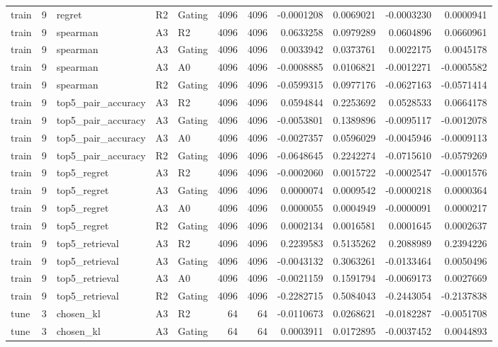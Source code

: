 \begin{tabular}{lrlllrrrrrr}
train & 9 & regret & R2 & Gating & 4096 & 4096 & -0.0001208 & 0.0069021 & -0.0003230 & 0.0000941 \\
train & 9 & spearman & A3 & R2 & 4096 & 4096 & 0.0633258 & 0.0979289 & 0.0604896 & 0.0660961 \\
train & 9 & spearman & A3 & Gating & 4096 & 4096 & 0.0033942 & 0.0373761 & 0.0022175 & 0.0045178 \\
train & 9 & spearman & A3 & A0 & 4096 & 4096 & -0.0008885 & 0.0106821 & -0.0012271 & -0.0005582 \\
train & 9 & spearman & R2 & Gating & 4096 & 4096 & -0.0599315 & 0.0977176 & -0.0627163 & -0.0571414 \\
train & 9 & top5_pair_accuracy & A3 & R2 & 4096 & 4096 & 0.0594844 & 0.2253692 & 0.0528533 & 0.0664178 \\
train & 9 & top5_pair_accuracy & A3 & Gating & 4096 & 4096 & -0.0053801 & 0.1389896 & -0.0095117 & -0.0012078 \\
train & 9 & top5_pair_accuracy & A3 & A0 & 4096 & 4096 & -0.0027357 & 0.0596029 & -0.0045946 & -0.0009113 \\
train & 9 & top5_pair_accuracy & R2 & Gating & 4096 & 4096 & -0.0648645 & 0.2242274 & -0.0715610 & -0.0579269 \\
train & 9 & top5_regret & A3 & R2 & 4096 & 4096 & -0.0002060 & 0.0015722 & -0.0002547 & -0.0001576 \\
train & 9 & top5_regret & A3 & Gating & 4096 & 4096 & 0.0000074 & 0.0009542 & -0.0000218 & 0.0000364 \\
train & 9 & top5_regret & A3 & A0 & 4096 & 4096 & 0.0000055 & 0.0004949 & -0.0000091 & 0.0000217 \\
train & 9 & top5_regret & R2 & Gating & 4096 & 4096 & 0.0002134 & 0.0016581 & 0.0001645 & 0.0002637 \\
train & 9 & top5_retrieval & A3 & R2 & 4096 & 4096 & 0.2239583 & 0.5135262 & 0.2088989 & 0.2394226 \\
train & 9 & top5_retrieval & A3 & Gating & 4096 & 4096 & -0.0043132 & 0.3063261 & -0.0133464 & 0.0050496 \\
train & 9 & top5_retrieval & A3 & A0 & 4096 & 4096 & -0.0021159 & 0.1591794 & -0.0069173 & 0.0027669 \\
train & 9 & top5_retrieval & R2 & Gating & 4096 & 4096 & -0.2282715 & 0.5084043 & -0.2443054 & -0.2137838 \\
tune & 3 & chosen_kl & A3 & R2 & 64 & 64 & -0.0110673 & 0.0268621 & -0.0182287 & -0.0051708 \\
tune & 3 & chosen_kl & A3 & Gating & 64 & 64 & 0.0003911 & 0.0172895 & -0.0037452 & 0.0044893 \\

\end{tabular}
